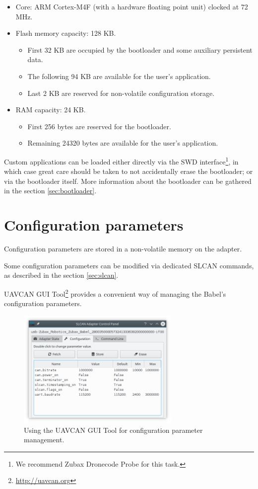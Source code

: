 \documentclass{zubaxdoc}
\begin{document}
\begin{itemize}
    \item Core: ARM Cortex-M4F (with a hardware floating point unit) clocked at 72 MHz.
    \item Flash memory capacity: 128 KB.
    \begin{itemize}
        \item First 32 KB are occupied by the bootloader and some auxiliary persistent data.
        \item The following 94 KB are available for the user's application.
        \item Last 2 KB are reserved for non-volatile configuration storage.
    \end{itemize}
    \item RAM capacity: 24 KB.
    \begin{itemize}
        \item First 256 bytes are reserved for the bootloader.
        \item Remaining 24320 bytes are available for the user's application.
    \end{itemize}
\end{itemize}

Custom applications can be loaded either directly via the
SWD interface\footnote{We recommend Zubax Dronecode Probe for this task.},
in which case great care should be taken to not accidentally erase the bootloader;
or via the bootloader itself.
More information about the bootloader can be gathered in the section \ref{sec:bootloader}.

\chapter{Configuration parameters}\label{sec:configuration_parameters}

Configuration parameters are stored in a non-volatile memory on the adapter.

Some configuration parameters can be modified via dedicated SLCAN commands,
as described in the section \ref{sec:slcan}.

UAVCAN GUI Tool\footnote{\url{http://uavcan.org}} provides a convenient way of managing the
Babel's configuration parameters.

\begin{figure}[hbtp]
	\centerline{\includegraphics[width=0.7\textwidth]{uavcan_gui_tool_adapter_configuration}}
	\caption{Using the UAVCAN GUI Tool for configuration parameter management.}
\end{figure}
\end{document}
